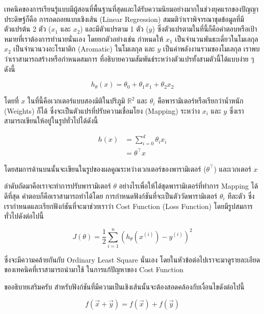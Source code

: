 เทคนิคของการเรียนรู้แบบมีผู้สอนที่พื้นฐานที่สุดและได้รับความนิยมอย่างมากในช่วงยุคแรกของปัญญาประดิษฐ์ก็คือ การถดถอยแบบเชิงเส้น 
(Linear Regression) สมมติว่าเราพิจารณาชุดข้อมูลที่มีตัวแปรต้น 2 ตัว ($x_{1}$ และ $x_{2}$) และมีตัวแปรตาม 1 ตัว ($y$) 
ซึ่งตัวแปรตามในที่นี้ก็คือคำตอบหรือเป้าหมายที่เราต้องการทำนายนั่นเอง โดยยกตัวอย่างเช่น กำหนดให้ $x_{1}$ เป็นจำนวนพันธะเดี่ยวในโมเลกุล 
$x_{2}$ เป็นจำนวนวงอะโรมาติก (Aromatic) ในโมเลกุล และ $y$ เป็นค่าพลังงานรวมของโมเลกุล เราพบว่าเราสามารถสร้างหรือกำหนดสมการ%
ที่อธิบายความสัมพันธ์ระหว่างตัวแปรทั้งสามตัวนี้ได้แบบง่าย ๆ ดังนี้

\begin{equation}
    h_\theta(x) = \theta_0 + \theta_1 x_1 + \theta_2 x_2
\end{equation}

\noindent โดยที่ $x$ ในที่นี้คือเวกเตอร์แบบสองมิติในปริภูมิ $\mathbb{R}^{2}$ และ $\theta_{i}$ คือพารามิเตอร์หรือเรียกว่าน้ำหนัก 
(Weights) ก็ได้ ซึ่งจะเป็นตัวแปรที่ปรับความเชื่อมโยง (Mapping) ระหว่าง $x_{i}$ และ $y$ ซึ่งเราสามารถเขียนให้อยู่ในรูปทั่วไปได้ดังนี้

\begin{align}
    h(x) &= \sum_{i=0}^{d} \theta_{i} x_{i} \\
         &= \theta^{\top} x
\end{align}

\noindent โดยสมการด้านบนนั้นจะเขียนในรูปของผลคูณระหว่างเวกเตอร์ของพารามิเตอร์ ($\theta^{\top}$) และเวกเตอร์ $x$

ลำดับถัดมาคือเราจะทำการปรับพารามิเตอร์ $\theta$ อย่างไรเพื่อให้ได้ชุดพารามิเตอร์ที่ทำการ Mapping ได้ดีที่สุด คำตอบก็คือเราสามารถทำได้โดย%
การกำหนดฟังก์ชันที่จะเป็นตัววัดพารามิเตอร์ $\theta_{i}$ ทีละตัว ซึ่งเรากำหนดและเรียกฟังก์ชันที่จะมาช่วยเราว่า Cost Function (Loss Function)
โดยมีรูปสมการทั่วไปดังต่อไปนี้ 

\begin{equation}
    J(\theta) = \frac 1 2 \sum_{i=1}^n \left( h_\theta(x^{(i)}) - y^{(i)} \right)^2
\end{equation}

\noindent ซึ่งจะมีความคล้ายกันกับ Ordinary Least Square นั่นเอง โดยในหัวข้อต่อไปเราจะมาดูรายละเอียดของเทคนิคที่เราสามารถนำมาใช้%
ในการแก้ปัญหาของ Cost Function

\noindent ขออธิบายเสริมครับ สำหรับฟังก์ชันที่มีความเป็นเชิงเส้นนั้นจะต้องสอดคล้องกับเงื่อนไขดังต่อไปนี้

\begin{equation}
    f(\vec{x} + \vec{y}) = f(\vec{x}) + f(\vec{y})
\end{equation}

